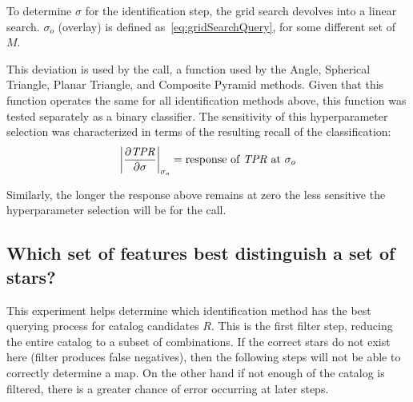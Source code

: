 To determine $\sigma$ for the identification step, the grid search devolves into a linear search.
$\sigma_o$ (overlay) is defined as~\autoref{eq:gridSearchQuery}, for some different set of $M$.

This deviation is used by the  call, a function used by the Angle, Spherical Triangle,
Planar Triangle, and Composite Pyramid methods.
Given that this function operates the same for all identification methods above, this function was tested separately
as a binary classifier.
The sensitivity of this hyperparameter selection was characterized in terms of the resulting recall of the
classification:
\begin{equation}
    \label{eq:sensitivityIdentification}
    \left\lvert\frac{\partial \mathit{TPR}}{\partial \sigma}\right\rvert_{\sigma_o} = \text{response of } \mathit{TPR}
    \text{ at } \sigma_o \\
\end{equation}

Similarly, the longer the response above remains at zero the less sensitive the hyperparameter selection will be for
the  call.

\subsection{Which set of features best distinguish a set of stars?}\label{subsec:querySelectivityMethods}
This experiment helps determine which identification method has the best querying process for catalog candidates $R$.
This is the first filter step, reducing the entire catalog to a subset of combinations.
If the correct stars do not exist here (filter produces false negatives), then the following steps will not be able to
correctly determine a map.
On the other hand if not enough of the catalog is filtered, there is a greater chance of error occurring at later steps.

